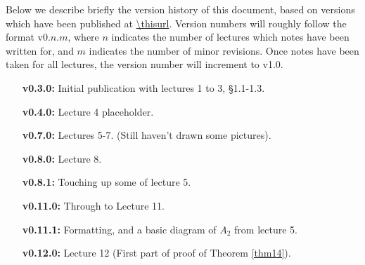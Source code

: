 Below we describe briefly the version history of this document, based on
versions which have been published at \url{\thisurl}. Version numbers will
roughly follow the format v0.$n$.$m$, where $n$ indicates the number of
lectures which notes have been written for, and $m$ indicates the number of
minor revisions. Once notes have been taken for all lectures, the version
number will increment to v1.0.

\begin{enumerate}
\item[\bf v0.3.0:] Initial publication with lectures 1 to 3, \S1.1-1.3.
\item[\bf v0.4.0:] Lecture 4 placeholder.
\item[\bf v0.7.0:] Lectures 5-7. (Still haven't drawn some pictures).
\item[\bf v0.8.0:] Lecture 8.
\item[\bf v0.8.1:] Touching up some of lecture 5.
\item[\bf v0.11.0:] Through to Lecture 11.
\item[\bf v0.11.1:] Formatting, and a basic diagram of $A_2$ from lecture 5.
\item[\bf v0.12.0:] Lecture 12 (First part of proof of Theorem \ref{thm14}).
\end{enumerate}
